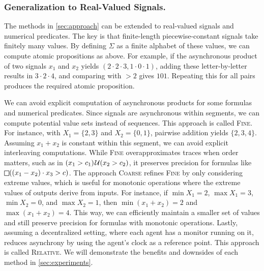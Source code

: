 \subsubsection{Generalization to Real-Valued Signals.}
The methods in \cref{sec:approach} can be extended to real-valued signals and numerical predicates.
The key is that finite-length piecewise-constant signals take finitely many values.
By defining $\Sigma$ as a finite alphabet of these values, we can compute atomic propositions as above.
For example, if the asynchronous product of two signals $x_1$ and $x_2$ yields $(2\cdot2\cdot3, 1\cdot0\cdot1)$, adding these letter-by-letter results in $3 \cdot 2 \cdot 4$, and comparing with $> 2$ gives $101$. Repeating this for all pairs produces the required atomic proposition.

We can avoid explicit computation of asynchronous products for some formulas and numerical predicates.
Since signals are asynchronous within segments, we can compute potential value sets instead of sequences.
This approach is called \textsc{Fine}.
For instance, with $X_1 = \{2,3\}$ and $X_2 = \{0,1\}$, pairwise addition yields $\{2, 3, 4\}$.
Assuming $x_1 + x_2$ is constant within this segment, we can avoid explicit interleaving computations.
While \textsc{Fine} overapproximates traces when order matters, such as in $(x_1 > c_1) \kern.1em\mathcal{U} (x_2 > c_2)$, it preserves precision for formulas like $\LTLalways((x_1 - x_2) \cdot x_3 > c)$.
The approach \textsc{Coarse} refines \textsc{Fine} by only considering extreme values, which is useful for monotonic operations where the extreme values of outputs derive from inputs.
For instance, if $\min X_1 = 2$, $\max X_1 = 3$, $\min X_2 = 0$, and $\max X_2 = 1$, then $\min(x_1 + x_2) = 2$ and $\max(x_1 + x_2) = 4$.
This way, we can efficiently maintain a smaller set of values and still preserve precision for formulas with monotonic operations.
Lastly, assuming a decentralized setting, where each agent has a monitor running on it, reduces asynchrony by using the agent's clock as a reference point.
This approach is called \textsc{Relative}.
We will demonstrate the benefits and downsides of each method in \cref{sec:experiments}.

